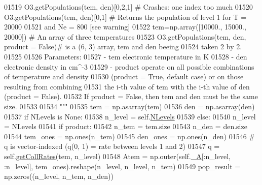 \begin{DoxyCode}
01519 \textcolor{stringliteral}{            O3.getPopulations(tem, den)[0,2,1]  # Crashes: one index too much}
01520 \textcolor{stringliteral}{            O3.getPopulations(tem, den)[0,1]    # Returns the population of level 1 for T = 20000 }
01521 \textcolor{stringliteral}{                                                    and Ne = 800 [see warning]}
01522 \textcolor{stringliteral}{            tem=np.array([10000., 15000., 20000]) # An array of three temperatures}
01523 \textcolor{stringliteral}{            O3.getPopulations(tem, den, product = False)# is a (6, 3) array, tem and den beeing }
01524 \textcolor{stringliteral}{                                                            taken 2 by 2.}
01525 \textcolor{stringliteral}{        }
01526 \textcolor{stringliteral}{        Parameters:}
01527 \textcolor{stringliteral}{            - tem       electronic temperature in K}
01528 \textcolor{stringliteral}{            - den       electronic density in cm^-3}
01529 \textcolor{stringliteral}{            - product   operate on all possible combinations of temperature and density }
01530 \textcolor{stringliteral}{                      (product = True, default case) or on those resulting from combining }
01531 \textcolor{stringliteral}{                      the i-th value of tem with the i-th value of den (product = False).}
01532 \textcolor{stringliteral}{                      If product = False, then tem and den must be the same size.}
01533 \textcolor{stringliteral}{}
01534 \textcolor{stringliteral}{        """}
01535         tem = np.asarray(tem)
01536         den = np.asarray(den)
01537         \textcolor{keywordflow}{if} NLevels \textcolor{keywordflow}{is} \textcolor{keywordtype}{None}:
01538             n\_level = self.\hyperlink{classpyneb_1_1core_1_1pynebcore_1_1_atom_a6b43c1e6431a6786c1b4267f704fb4e8}{NLevels}
01539         \textcolor{keywordflow}{else}:
01540             n\_level = NLevels
01541         \textcolor{keywordflow}{if} product:
01542             n\_tem = tem.size
01543             n\_den = den.size
01544             tem\_ones = np.ones(n\_tem)
01545             den\_ones = np.ones(n\_den)
01546             \textcolor{comment}{# q is vector-indexed (q(0, 1) = rate between levels 1 and 2)}
01547             q = self.\hyperlink{classpyneb_1_1core_1_1pynebcore_1_1_atom_a34711ea989baf7bde752a68255d32098}{getCollRates}(tem, n\_level)
01548             Atem = np.outer(self.\hyperlink{classpyneb_1_1core_1_1pynebcore_1_1_atom_aa6416fe661b8deaa008179314727e025}{\_A}[:n\_level, :n\_level], tem\_ones).reshape(n\_level, n\_level, n\_tem)
01549             pop\_result = np.zeros((n\_level, n\_tem, n\_den))

\end{DoxyCode}
